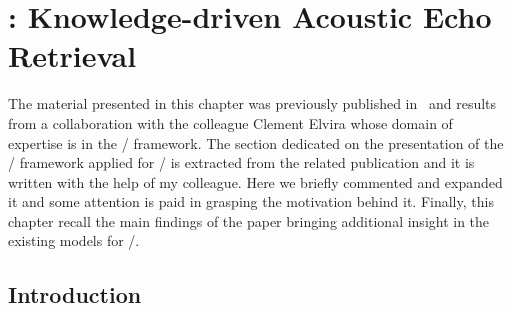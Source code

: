 \chapter{: Knowledge-driven Acoustic Echo Retrieval}\label{ch:blaster}


\vspace{-2.5em}
 \synopsisChBlaster

\mynewline
The material presented in this chapter was previously published in~\cite{di2020blaster} and results from a collaboration with the colleague Clement Elvira whose domain of expertise is in the \CDdef/ framework.
The section dedicated on the presentation of the \CD/ framework applied for \AER/ is extracted from the related publication and it is written with the help of my colleague.
Here we briefly commented and expanded it and some attention is paid in grasping the motivation behind it.
Finally, this chapter recall the main findings of the paper bringing additional insight in the existing models for \AER/.

\section{Introduction}
\label{sec:blaster:intro}

